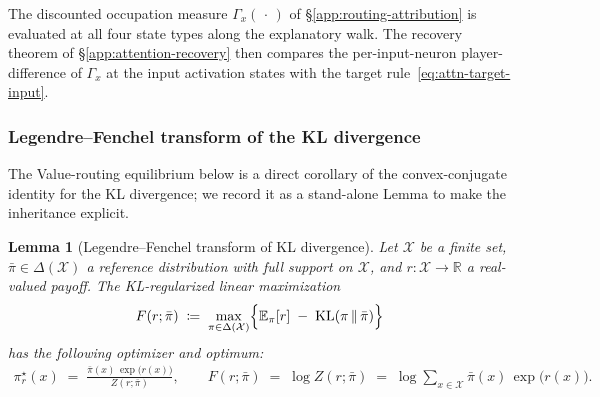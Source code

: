 \documentclass[twoside]{article}
\newcommand{\RR}{\mathbb{R}}
\providecommand{\E}{}
\renewcommand{\E}{\mathbb{E}}
\newcommand{\1}{\mathbf{1}}
\newtheorem{lemma}{Lemma}
\begin{document}
The discounted occupation measure $\Gamma_x(\,\cdot\,)$ of \S\ref{app:routing-attribution} is
evaluated at all four state types along the explanatory walk. The recovery theorem of
\S\ref{app:attention-recovery} then compares the per-input-neuron player-difference of $\Gamma_x$
at the input activation states with the target rule~\eqref{eq:attn-target-input}.

\subsubsection{Legendre--Fenchel transform of the KL divergence}\label{app:kl-legendre-fenchel}

The Value-routing equilibrium below is a direct corollary of the convex-conjugate identity for the
KL divergence; we record it as a stand-alone Lemma to make the inheritance explicit.

\begin{lemma}[Legendre--Fenchel transform of KL divergence]\label{lem:kl-legendre-fenchel}
Let $\mathcal{X}$ be a finite set, $\bar\pi \in \Delta(\mathcal{X})$ a reference distribution with
full support on $\mathcal{X}$, and $r : \mathcal{X} \to \RR$ a real-valued payoff. The
KL-regularized linear maximization
\begin{align}\label{eq:kl-lf-objective}
    F(r;\bar\pi) \;\coloneqq\; \max_{\pi \in \Delta(\mathcal{X})}
    \Bigl\{ \E_\pi[r] \;-\; \mathrm{KL}(\pi \,\|\, \bar\pi) \Bigr\}
\end{align}
has the following optimizer and optimum:
\begin{align}\label{eq:kl-lf-optimizer}
    \pi_r^\star(x) \;=\; \frac{\bar\pi(x)\,\exp\!\bigl(r(x)\bigr)}{Z(r;\bar\pi)},
    \qquad
    F(r;\bar\pi) \;=\; \log Z(r;\bar\pi) \;=\; \log\!\sum_{x \in \mathcal{X}}
    \bar\pi(x)\,\exp\!\bigl(r(x)\bigr).
\end{align}
\end{lemma}
\end{document}
